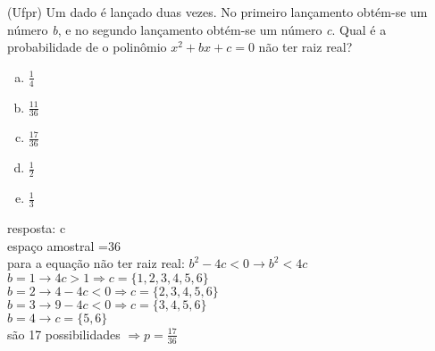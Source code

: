 \begin{ex}
(Ufpr) Um dado é lançado duas vezes. No primeiro lançamento obtém-se um número \textit{b}, e no segundo lançamento obtém-se um número \textit{c}. Qual é a probabilidade de o polinômio $x^2 + bx +c = 0 $ não ter raiz real?
   \begin{enumerate}[(a)]
   \item $\frac{1}{4}$
   \item $\frac{11}{36}$
   \item $\frac{17}{36}$
   \item $\frac{1}{2}$
   \item $\frac{1}{3}$
   \end{enumerate}
     \begin{sol}
      resposta: c \\
      espaço amostral =36 \\
      para a equação não ter raiz real: \hspace{0,4cm} $b^2 - 4 c <0 \rightarrow b^2 < 4c$ \\
       $b=1\rightarrow 4c>1 \Rightarrow c= \{1, 2, 3, 4, 5, 6\} $\\
       $b=2 \rightarrow 4-4c<0 \Rightarrow c = \{2, 3, 4, 5, 6\} $\\
       $b=3 \rightarrow 9-4c<0 \Rightarrow c = \{  3, 4, 5, 6\} $\\
       $b=4\rightarrow c =\{ 5, 6\} $ \\
       são 17 possibilidades $\Longrightarrow p=\frac{17}{36}$
     \end{sol}
\end{ex}